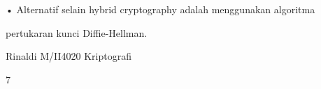 \documentclass{article}
\begin{document}

• Alternatif selain hybrid cryptography adalah menggunakan algoritma 

pertukaran kunci Diffie-Hellman.

Rinaldi M/II4020 Kriptografi

7
\end{document}
